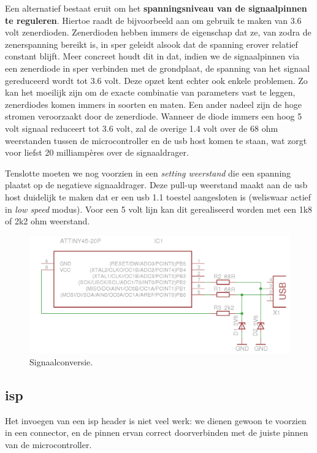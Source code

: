 Een alternatief bestaat eruit om het \textbf{spanningsniveau van de signaalpinnen te reguleren}. Hiertoe raadt de  bijvoorbeeld aan om gebruik te maken van 3.6 volt zenerdioden. Zenerdioden hebben immers de eigenschap dat ze, van zodra de zenerspanning bereikt is, in sper geleidt alsook dat de spanning erover relatief constant blijft. Meer concreet houdt dit in dat, indien we de signaalpinnen via een zenerdiode in sper verbinden met de grondplaat, de spanning van het signaal gereduceerd wordt tot 3.6 volt. Deze opzet kent echter ook enkele problemen. Zo kan het moeilijk zijn om de exacte combinatie van parameters vast te leggen, zenerdiodes komen immers in soorten en maten. Een ander nadeel zijn de hoge stromen veroorzaakt door de zenerdiode. Wanneer de diode immers een hoog 5 volt signaal reduceert tot 3.6 volt, zal de overige 1.4 volt over de 68 ohm weerstanden tussen de microcontroller en de \ac{usb} host komen te staan, wat zorgt voor liefst 20 milliampères over de signaaldrager.

Tenslotte moeten we nog voorzien in een \emph{setting weerstand} die een spanning plaatst op de negatieve signaaldrager. Deze pull-up weerstand maakt aan de \ac{usb} host duidelijk te maken dat er een \ac{usb} 1.1 toestel aangesloten is (weliswaar actief in \emph{low speed} modus). Voor een 5 volt lijn kan dit gerealiseerd worden met een 1k8 of 2k2 ohm weerstand.

\begin{figure}
	\includegraphics[width=\textwidth]{afbeeldingen/inputmodule_signaal}
	\caption{Signaalconversie.}
\end{figure}

\subsection{\acs{isp}}

Het invoegen van een \ac{isp} header is niet veel werk: we dienen gewoon te voorzien in een connector, en de pinnen ervan correct doorverbinden met de juiste pinnen van de microcontroller.

